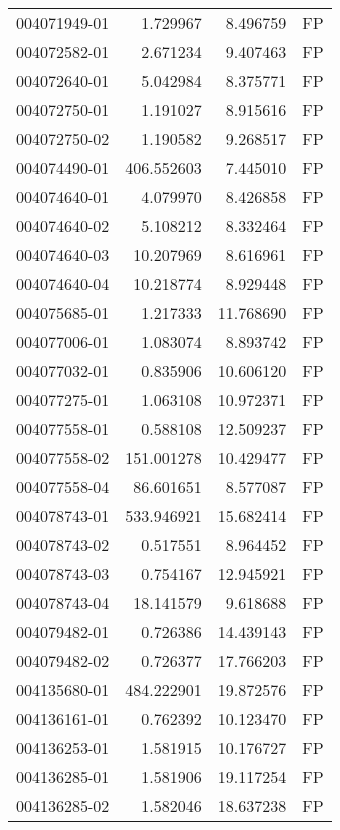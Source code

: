 \begin{tabular}{lrrl}
004071949-01 &    1.729967 &       8.496759 &   FP \\
004072582-01 &    2.671234 &       9.407463 &   FP \\
004072640-01 &    5.042984 &       8.375771 &   FP \\
004072750-01 &    1.191027 &       8.915616 &   FP \\
004072750-02 &    1.190582 &       9.268517 &   FP \\
004074490-01 &  406.552603 &       7.445010 &   FP \\
004074640-01 &    4.079970 &       8.426858 &   FP \\
004074640-02 &    5.108212 &       8.332464 &   FP \\
004074640-03 &   10.207969 &       8.616961 &   FP \\
004074640-04 &   10.218774 &       8.929448 &   FP \\
004075685-01 &    1.217333 &      11.768690 &   FP \\
004077006-01 &    1.083074 &       8.893742 &   FP \\
004077032-01 &    0.835906 &      10.606120 &   FP \\
004077275-01 &    1.063108 &      10.972371 &   FP \\
004077558-01 &    0.588108 &      12.509237 &   FP \\
004077558-02 &  151.001278 &      10.429477 &   FP \\
004077558-04 &   86.601651 &       8.577087 &   FP \\
004078743-01 &  533.946921 &      15.682414 &   FP \\
004078743-02 &    0.517551 &       8.964452 &   FP \\
004078743-03 &    0.754167 &      12.945921 &   FP \\
004078743-04 &   18.141579 &       9.618688 &   FP \\
004079482-01 &    0.726386 &      14.439143 &   FP \\
004079482-02 &    0.726377 &      17.766203 &   FP \\
004135680-01 &  484.222901 &      19.872576 &   FP \\
004136161-01 &    0.762392 &      10.123470 &   FP \\
004136253-01 &    1.581915 &      10.176727 &   FP \\
004136285-01 &    1.581906 &      19.117254 &   FP \\
004136285-02 &    1.582046 &      18.637238 &   FP \\

\end{tabular}

